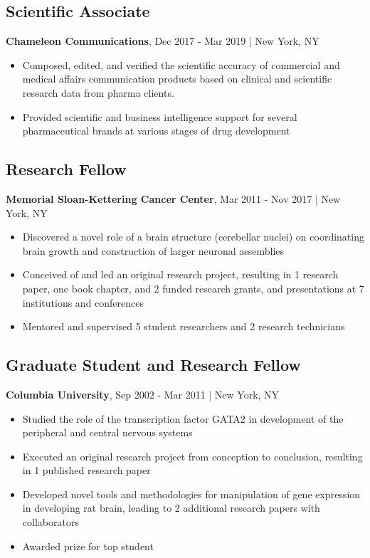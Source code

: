 \documentclass[11pt]{article}
\newenvironment{myitemize}
{ \begin{itemize}
	\setlength{\itemsep}{0pt}
	\setlength{\parskip}{0pt}
	\setlength{\parsep}{0pt}     }
{ \end{itemize}                  }
\begin{document}
\subsection*{Scientific Associate}
{\bfseries Chameleon Communications}, Dec 2017 - Mar 2019 | New York, NY
\begin{myitemize}
	\item Composed, edited, and verified the scientific accuracy of commercial and medical affairs communication products based on clinical and scientific research data from pharma clients.
	\item Provided scientific and business intelligence support for several pharmaceutical brands at various stages of drug development
\end{myitemize}

\subsection*{Research Fellow}
{\bfseries Memorial Sloan-Kettering Cancer Center}, Mar 2011 - Nov 2017 | New York, NY
\begin{myitemize}
	\item Discovered a novel role of a brain structure (cerebellar nuclei) on coordinating brain growth and construction of larger neuronal assemblies
	\item Conceived of and led an original research project, resulting in 1 research paper, one book chapter, and 2 funded research grants, and presentations at 7 institutions and conferences
	\item Mentored and supervised 5 student researchers and 2 research technicians
\end{myitemize}

\subsection*{Graduate Student and Research Fellow}
{\bfseries Columbia University}, Sep 2002 - Mar 2011 | New York, NY
\begin{myitemize}
	\item Studied the role of the transcription factor GATA2 in development of the peripheral and central nervous systems
	\item Executed an original research project from conception to conclusion, resulting in 1 published research paper 
	\item Developed novel tools and methodologies for manipulation of gene expression in developing rat brain, leading to 2 additional research papers with collaborators
	\item Awarded prize for top student
\end{myitemize}
\end{document}
